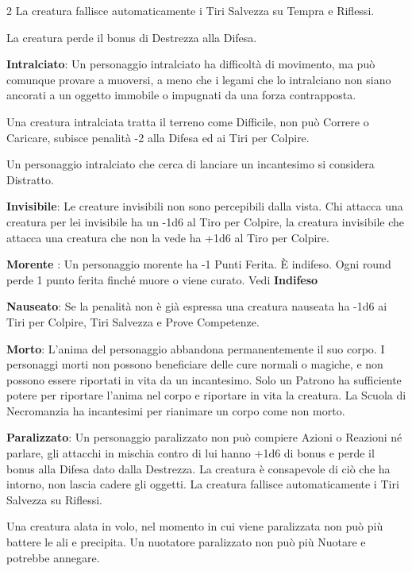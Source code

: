 \begin{multicols}{2}
La creatura fallisce automaticamente i Tiri Salvezza su Tempra e Riflessi.

La creatura perde il bonus di Destrezza alla Difesa.

\textbf{Intralciato}:\hypertarget{intralciato}{}\label{intralciato} Un personaggio intralciato ha difficoltà di movimento, ma può comunque provare a muoversi, a meno che i legami che lo intralciano non siano ancorati a un oggetto immobile o impugnati da una forza contrapposta.

Una creatura intralciata tratta il terreno come Difficile, non può Correre o Caricare, subisce penalità -2 alla Difesa ed ai Tiri per Colpire.

Un personaggio intralciato che cerca di lanciare un incantesimo si considera Distratto.

\textbf{Invisibile}: Le creature invisibili non sono percepibili dalla vista.
Chi attacca una creatura per lei invisibile ha un -1d6 al Tiro per Colpire, la creatura invisibile che attacca una creatura che non la vede ha +1d6 al Tiro per Colpire.

\textbf{Morente} : Un personaggio morente ha -1 Punti Ferita. È indifeso. Ogni round perde 1 punto ferita finché muore o viene curato. Vedi \textbf{Indifeso}

\textbf{Nauseato}: Se la penalità non è già espressa una creatura nauseata ha -1d6 ai Tiri per Colpire, Tiri Salvezza e Prove Competenze.

\textbf{Morto}:\hypertarget{morto}{} L'anima del personaggio abbandona permanentemente il suo corpo. I personaggi morti non possono beneficiare delle cure normali o magiche, e non possono essere riportati in vita da un incantesimo. Solo un Patrono ha sufficiente potere per riportare l'anima nel corpo e riportare in vita la creatura. La Scuola di Necromanzia ha incantesimi per rianimare un corpo come non morto.

\textbf{Paralizzato}:  Un personaggio paralizzato non può compiere Azioni o Reazioni né parlare, gli attacchi in mischia contro di lui hanno +1d6 di bonus e perde il bonus alla Difesa dato dalla Destrezza. La creatura è consapevole di ciò che ha intorno, non lascia cadere gli oggetti. La creatura fallisce automaticamente i Tiri Salvezza su Riflessi.

Una creatura alata in volo, nel momento in cui viene paralizzata non può più battere le ali e precipita. Un nuotatore paralizzato non può più Nuotare e potrebbe annegare.


\end{multicols}

